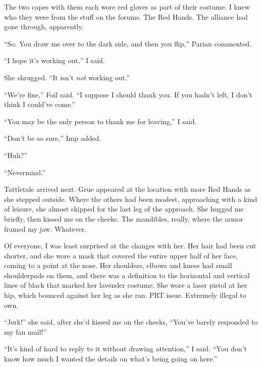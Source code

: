 The two capes with them each wore red gloves as part of their costume.  I knew who they were from the stuff on the forums.  The Red Hands.  The alliance had gone through, apparently.



``So.  You draw me over to the dark side, and then you flip,'' Parian commented.



``I hope it's working out,'' I said.



She shrugged.  ``It isn't \emph{not} working out.''



``We're fine,'' Foil said.  ``I suppose I should thank you.  If you hadn't left, I don't think I could've come.''



``You may be the only person to thank me for leaving,'' I said.



``Don't be so sure,'' Imp added.



``Huh?''



``Nevermind.''



Tattletale arrived next.  Grue appeared at the location with more Red Hands as she stepped outside.  Where the others had been modest, approaching with a kind of leisure, she almost skipped for the last leg of the approach.  She hugged me briefly, then kissed me on the cheeks.  The mandibles, really, where the armor framed my jaw.  Whatever.



Of everyone, I was least surprised at the changes with her.  Her hair had been cut shorter, and she wore a mask that covered the entire upper half of her face, coming to a point at the nose.  Her shoulders, elbows and knees had small shoulderpads on them, and there was a definition to the horizontal and vertical lines of black that marked her lavender costume.  She wore a laser pistol at her hip, which bounced against her leg as she ran.  PRT issue.  Extremely illegal to own.



``Jerk!'' she said, after she'd kissed me on the cheeks, ``You've barely responded to my fan mail!''



``It's kind of hard to reply to it without drawing attention,'' I said.  ``You don't know how much I wanted the details on what's being going on here.''



